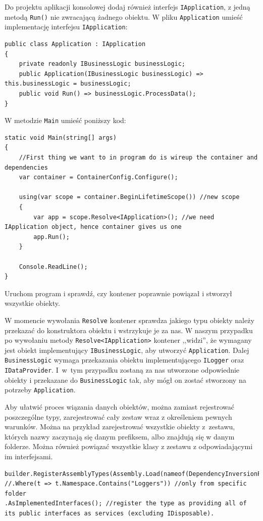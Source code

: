 Do projektu aplikacji konsolowej dodaj również interfejs \texttt{IApplication}, z jedną metodą \texttt{Run()} nie zwracającą żadnego obiektu. W pliku \texttt{Application} umieść implementację interfejsu \texttt{IApplication}:
\begin{lstlisting}
public class Application : IApplication
{
	private readonly IBusinessLogic businessLogic;	
	public Application(IBusinessLogic businessLogic) => this.businessLogic = businessLogic;	
	public void Run() => businessLogic.ProcessData();
}
\end{lstlisting}

W metodzie \texttt{Main} umieść poniższy kod:
\begin{lstlisting}
static void Main(string[] args)
{
	//First thing we want to in program do is wireup the container and dependencies
	var container = ContainerConfig.Configure();
	
	using(var scope = container.BeginLifetimeScope()) //new scope 
	{
		var app = scope.Resolve<IApplication>(); //we need IApplication object, hence container gives us one
		app.Run();
	}
	
	Console.ReadLine();
}
\end{lstlisting}
Uruchom program i sprawdź, czy kontener poprawnie powiązał i stworzył wszystkie obiekty.

W momencie wywołania \texttt{Resolve} kontener sprawdza jakiego typu obiekty należy przekazać do konstruktora obiektu i wstrzykuje je za nas. W naszym przypadku po wywołaniu metody \texttt{Resolve<IApplication>} kontener ,,widzi'', że wymagany jest obiekt implementujący \texttt{IBusinessLogic}, aby utworzyć \texttt{Application}. Dalej \texttt{BusinessLogic} wymaga przekazania obiektu implementującego \texttt{ILogger} oraz \texttt{IDataProvider}. I~w~tym przypadku zostaną za nas utworzone odpowiednie obiekty i przekazane do \texttt{BusinessLogic} tak, aby mógł on zostać stworzony na potrzeby \texttt{Application}.

Aby ułatwić proces wiązania danych obiektów, można zamiast rejestrować poszczególne typy, zarejestrować cały zestaw wraz z określeniem pewnych warunków. Można na przykład zarejestrować wszystkie obiekty z~zestawu, których nazwy zaczynają się danym prefiksem, albo znajdują się w danym folderze. Można również powiązać wszystkie klasy z zestawu z odpowiadającymi im interfejsami.
\begin{lstlisting}
builder.RegisterAssemblyTypes(Assembly.Load(nameof(DependencyInversionPrincipleLib)))
//.Where(t => t.Namespace.Contains("Loggers")) //only from specific folder
.AsImplementedInterfaces(); //register the type as providing all of its public interfaces as services (excluding IDisposable).
\end{lstlisting}

